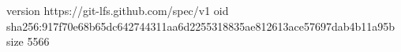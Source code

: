 version https://git-lfs.github.com/spec/v1
oid sha256:917f70e68b65dc642744311aa6d2255318835ae812613ace57697dab4b11a95b
size 5566
